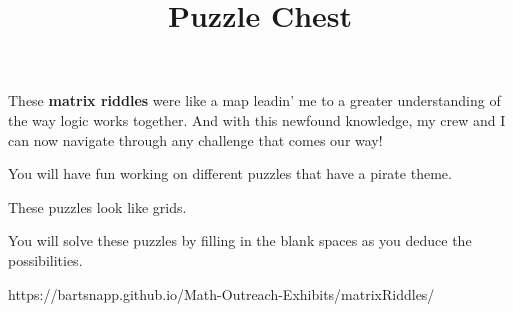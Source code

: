 \documentclass{../exhibit}
\title{Puzzle Chest}
\begin{document}
\begin{context}
These \textbf{matrix riddles} were like a map leadin' me to a greater understanding of the way logic works together. And with this newfound knowledge, my crew and I can now navigate through any challenge that comes our way!
\end{context}

\begin{directions}
  You will have fun working on different puzzles that have a pirate theme.

  These puzzles look like grids.

  You will solve these puzzles by filling in the blank spaces as you
deduce the possibilities.
\end{directions}

\begin{example}
\end{example}

\begin{mathConnections}
  https://bartsnapp.github.io/Math-Outreach-Exhibits/matrixRiddles/
\end{mathConnections}
\end{document}
